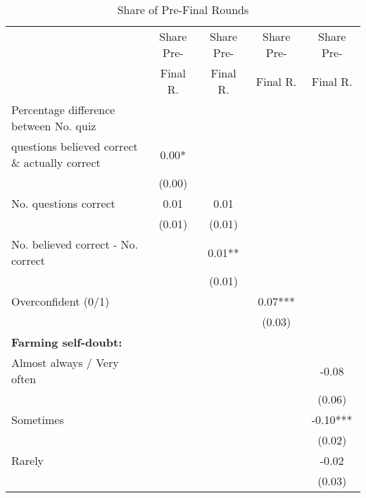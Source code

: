 \begin{table}[htbp]
\centering
\hspace*{-1.2cm}
\begin{threeparttable}
\small
\caption{Share of Pre-Final Rounds}
\label{tab:D2}
\begin{tabular}{l cccc}
\hline
\hline
& Share Pre- & Share Pre- & Share Pre- & Share Pre-  \\
& Final R. & Final R. & Final R. & Final R.  \\ \hline
Percentage difference between No. quiz&               &               &               &               \\
questions believed correct \& actually correct&        0.00*  &               &               &               \\
                    &      (0.00)   &               &               &               \\
No. questions correct&        0.01   &        0.01   &               &               \\
                    &      (0.01)   &      (0.01)   &               &               \\
No. believed correct - No. correct&               &        0.01** &               &               \\
                    &               &      (0.01)   &               &               \\
Overconfident (0/1) &               &               &        0.07***&               \\
                    &               &               &      (0.03)   &               \\
\textbf{Farming self-doubt:}&               &               &               &               \\
Almost always / Very often&               &               &               &       -0.08   \\
                    &               &               &               &      (0.06)   \\
Sometimes           &               &               &               &       -0.10***\\
                    &               &               &               &      (0.02)   \\
Rarely              &               &               &               &       -0.02   \\
                    &               &               &               &      (0.03)   \\

\end{tabular}
\end{threeparttable}
\end{table}

